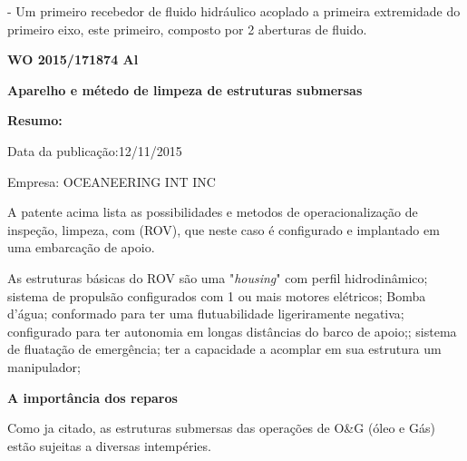 \documentclass[a4paper,12pt]{article}
\begin{document}
 - Um primeiro recebedor de fluido hidráulico acoplado a primeira extremidade do primeiro eixo, este primeiro, composto por 2 aberturas de fluido.



\vspace{1,0cm}
 \begin{center}
  \textbf{WO 2015/171874 Al} 
 
 \textbf{Aparelho e métedo de limpeza de estruturas submersas}
 \end{center}
 
 \textbf{Resumo:}
 
 Data da publicação:12/11/2015
 
 Empresa: OCEANEERING INT INC
 
 \vspace{1,0cm} 
 
 A patente acima lista as possibilidades e metodos de operacionalização de inspeção, limpeza, com (ROV), que neste caso é configurado e implantado em uma embarcação de apoio.
 
 As estruturas básicas do ROV são uma "\textit{housing}" com perfil hidrodinâmico; sistema de propulsão configurados com 1 ou mais motores elétricos; Bomba d'água; conformado para ter uma flutuabilidade ligeriramente negativa; configurado para ter autonomia em  longas distâncias do barco de apoio;; sistema de fluatação de emergência; ter a capacidade a acomplar em sua estrutura um manipulador;  
 

\vspace{1,0cm}
\hspace{-0,75cm}
\textbf{A importância dos reparos}
\vspace{1,0cm}
 
Como ja citado, as estruturas submersas das operações de O\&G (óleo e Gás) estão sujeitas a diversas intempéries.
 
\end{document}
